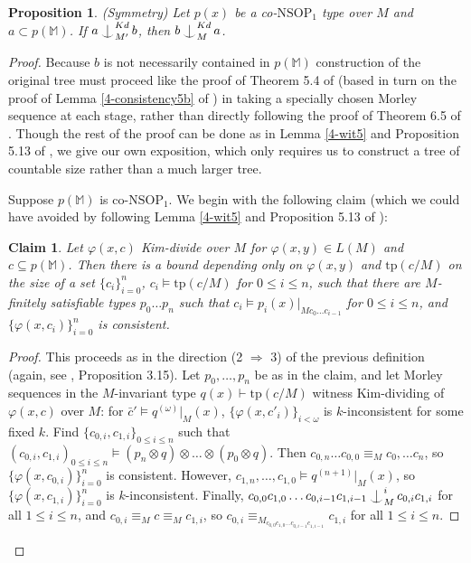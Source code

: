 \documentclass[12pt]{amsart}
\newtheorem{claim}[theorem]{Claim}
\newtheorem{proposition}[theorem]{Proposition}
\theoremstyle{definition}
\def\Ind#1#2{#1\setbox0=\hbox{$#1x$}\kern\wd0\hbox to 0pt{\hss$#1\mid$\hss}
\lower.9\ht0\hbox to 0pt{\hss$#1\smile$\hss}\kern\wd0}
\def\ind{\mathop{\mathpalette\Ind{}}}
\begin{document}
\begin{proposition}\label{4-symm3}
(Symmetry) Let $p(x)$ be a co-$\mathrm{NSOP}_{1}$ type over $M$ and $a \subset p(\mathbb{M})$. If $a \ind^{Kd}_{M'} b$, then $b\ind_{M}^{Kd} a$.

\end{proposition}

\begin{proof}
    Because $b$ is not necessarily contained in $ p(\mathbb{M})$ construction of the original tree must proceed like the proof of Theorem 5.4 of \cite{NSOP2} (based in turn on the proof of Lemma \ref{4-consistency5b} of \cite{KR17}) in taking a specially chosen Morley sequence at each stage, rather than directly following the proof of Theorem 6.5 of \cite{KR17}. Though the rest of the proof can be done as in Lemma \ref{4-wit5} and Proposition 5.13 of \cite{KR17}, we give our own exposition, which only requires us to construct a tree of countable size rather than a much larger tree.


    Suppose $p(\mathbb{M})$ is co-$\mathrm{NSOP}_{1}$. We begin with the following claim (which we could have avoided by following Lemma \ref{4-wit5} and Proposition 5.13 of \cite{KR17}):

    \begin{claim}\label{4-bound}
        Let $\varphi(x, c)$ Kim-divide over $M$ for $\varphi(x, y) \in L(M)$ and $c \subseteq p(\mathbb{M})$. Then there is a bound depending only on $\varphi(x, y)$ and $\mathrm{tp}(c/M)$ on the size of a set $\{c_{i}\}^{n}_{i= 0}$, $c_{i} \models \mathrm{tp}(c/M)$ for $0 \leq i \leq n$, such that there are $M$-finitely satisfiable types $p_{0} \ldots p_{n}$ such that $c_{i} \models p_{i}(x)|_{Mc_{0} \ldots c_{i-1}}$ for $0 \leq i \leq n$, and $\{\varphi(x, c_{i})\}^{n}_{i = 0}$ is consistent.
    \end{claim}

    \begin{proof}
        This proceeds as in the direction (2 $\Rightarrow$ 3) of the previous definition (again, see \cite{KR17}, Proposition 3.15). Let $p_{0}, \ldots, p_{n}$ be as in the claim, and let Morley sequences in the $M$-invariant type $q(x) \vdash \mathrm{tp}(c/M)$ witness Kim-dividing of $\varphi(x, c)$ over $M$: for $\bar{c}' \models q^{(\omega)}|_{M}(x)$, $\{\varphi(x, c'_{i})\}_{i < \omega}$ is $k$-inconsistent for some fixed $k$. Find $\{c_{0, i}, c_{1, i}\}_{0 \leq i \leq n}$ such that $(c_{0, i}, c_{1, i})_{0 \leq i \leq n} \models (p_{n} \otimes q)\otimes \ldots \otimes (p_{0} \otimes q)$. Then $c_{0, n} \ldots c_{0, 0} \equiv_{M} c_{0}, \ldots c_{n} $, so $\{\varphi(x, c_{0, i})\}^{n}_{i = 0}$ is consistent. However, $c_{1, n}, \ldots, c_{1, 0} \models q^{(n +1)}|_{M}(x)$, so  $\{\varphi(x, c_{1, i})\}^{n}_{i = 0}$ is $k$-inconsistent. Finally, $c_{0, 0}c_{1,0} \ldots c_{0, i-1} c_{1, i-1} \ind^{i}_{M} c_{0, i}c_{1, i}$ for all $1 \leq i \leq n$, and $c_{0,i} \equiv_{M} c \equiv_{M} c_{1, i}$, so $c_{0,i}\equiv_{M_{c_{0, 0}c_{1,0} \ldots c_{0, i-1} c_{1, i-1}}} c_{1, i}$ for all $1 \leq i \leq n$.


\end{proof}
\end{proof}
\end{document}
